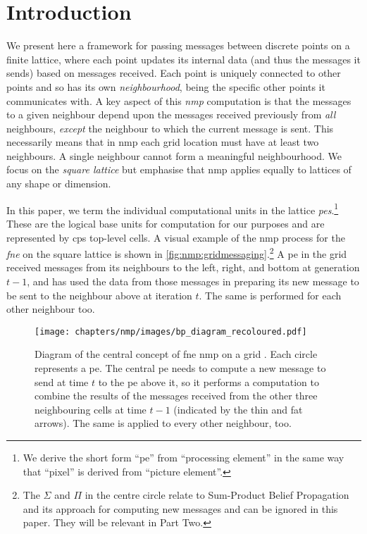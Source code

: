 \section{Introduction}
We present here a framework for passing messages between discrete points on a finite lattice, where each point updates its internal data (and thus the messages it sends) based on messages received.  Each point is uniquely connected to other points and so has its own \emph{neighbourhood}, being the specific other points it communicates with.  A key aspect of this \emph{\gls{nmp}} computation is that the messages to a given neighbour depend upon the messages received previously from \emph{all} neighbours, \emph{except} the neighbour to which the current message is sent.    This necessarily means that in \gls{nmp} each grid location must have at least two neighbours.  A single neighbour cannot form a meaningful neighbourhood.  We focus on the \emph{square lattice} but emphasise that \gls{nmp} applies equally to lattices of any shape or dimension.

In this paper, we term the individual computational units in the lattice \emph{\glspl{pe}}.\footnote{We derive the short form ``\gls{pe}'' from ``processing element'' in the same way that ``pixel'' is derived from ``picture element''.}  These are the logical base units for computation for our purposes and are represented by \gls{cps} top-level cells.  A visual example of the \gls{nmp} process for the \emph{\gls{fne}} on the square lattice is shown in \autoref{fig:nmp:gridmessaging}.\footnote{The \(\Sigma\) and \(\Pi\) in the centre circle relate to Sum-Product Belief Propagation and its approach for computing new messages and can be ignored in this paper.  They will be relevant in Part Two.}  A \gls{pe} in the grid received messages from its neighbours to the left, right, and bottom at generation \(t - 1\), and has used the data from those messages in preparing its new message to be sent to the neighbour above at iteration \(t\).  The same is performed for each other neighbour too.

\begin{figure}
    \centering
    \texttt{[image: chapters/nmp/images/bp\_diagram\_recoloured.pdf]}
    \caption[Diagram of the central concept of \gls{fne} \acrlong{nmp} on a grid]{Diagram of the central concept of \gls{fne} \gls{nmp} on a grid \cite{lbpmpsmpic}.  Each circle represents a \gls{pe}.  The central \gls{pe} needs to compute a new message to send at time \(t\) to the \gls{pe} above it, so it performs a computation to combine the results of the messages received from the other three neighbouring cells at time \(t - 1\) (indicated by the thin and fat arrows).  The same is applied to every other neighbour, too.}
    \label{fig:nmp:gridmessaging}
\end{figure}

